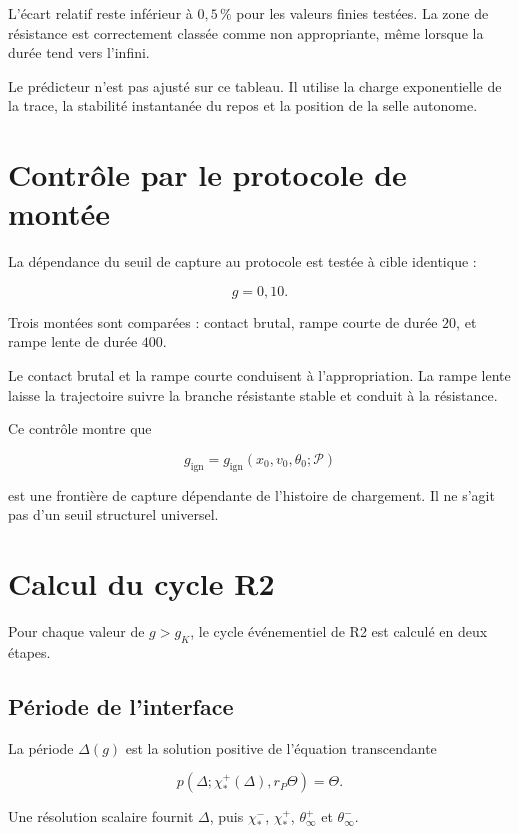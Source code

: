 L'écart relatif reste inférieur à \(0{,}5\,\%\) pour les valeurs
finies testées. La zone de résistance est correctement classée comme
non appropriante, même lorsque la durée tend vers l'infini.

Le prédicteur n'est pas ajusté sur ce tableau. Il utilise la charge
exponentielle de la trace, la stabilité instantanée du repos et la
position de la selle autonome.

\section{Contrôle par le protocole de montée}
\label{annexe-num-rampes}

La dépendance du seuil de capture au protocole est testée à cible
identique :

\[
g=0{,}10.
\]

Trois montées sont comparées : contact brutal, rampe courte de durée
\(20\), et rampe lente de durée \(400\).

Le contact brutal et la rampe courte conduisent à l'appropriation. La
rampe lente laisse la trajectoire suivre la branche résistante stable
et conduit à la résistance.

Ce contrôle montre que

\[
g_{\mathrm{ign}}
=
g_{\mathrm{ign}}(x_0,v_0,\theta_0;\mathcal P)
\]

est une frontière de capture dépendante de l'histoire de chargement.
Il ne s'agit pas d'un seuil structurel universel.

\section{Calcul du cycle R2}
\label{annexe-num-cycle-r2}

Pour chaque valeur de \(g>g_K\), le cycle événementiel de R2 est
calculé en deux étapes.

\subsection{Période de l'interface}

La période \(\Delta(g)\) est la solution positive de l'équation
transcendante

\[
p\left(\Delta;\chi_\ast^+(\Delta),r_P\Theta\right)=\Theta.
\]

Une résolution scalaire fournit \(\Delta\), puis
\(\chi_\ast^-\), \(\chi_\ast^+\), \(\theta_\infty^+\) et
\(\theta_\infty^-\).

